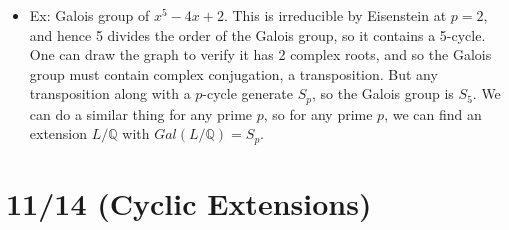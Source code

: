 \documentclass[11pt, oneside]{amsart}   	%
\theoremstyle{definition}
\begin{document}
\begin{itemize}
	\item Ex: Galois group of $x^5 - 4x + 2$. This is irreducible by Eisenstein at $p = 2$, and hence 5 divides the order of the Galois group, so it contains 
	a 5-cycle. One can draw the graph to verify it has 2 complex roots, and so the Galois group must contain complex conjugation, a transposition. But any 
	transposition along with a $p$-cycle generate $S_p$, so the Galois group is $S_5$. We can do a similar thing for any prime $p$, so for any prime $p$, 
	we can find an extension $L / \mathbb Q$ with $Gal(L / \mathbb Q) = S_p$.

\end{itemize}

\section{11/14 (Cyclic Extensions)}
\end{document}

